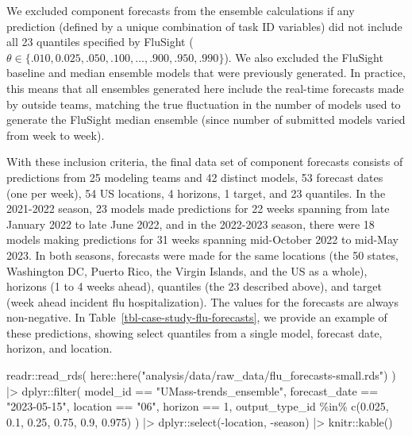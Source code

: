 \documentclass[
]{article}
\newenvironment{Shaded}{\begin{snugshade}}{\end{snugshade}}
\newcommand{\DecValTok}[1]{\textcolor[rgb]{0.68,0.00,0.00}{#1}}
\newcommand{\FloatTok}[1]{\textcolor[rgb]{0.68,0.00,0.00}{#1}}
\newcommand{\FunctionTok}[1]{\textcolor[rgb]{0.28,0.35,0.67}{#1}}
\newcommand{\NormalTok}[1]{\textcolor[rgb]{0.00,0.23,0.31}{#1}}
\newcommand{\SpecialCharTok}[1]{\textcolor[rgb]{0.37,0.37,0.37}{#1}}
\newcommand{\StringTok}[1]{\textcolor[rgb]{0.13,0.47,0.30}{#1}}
\begin{document}
We excluded component forecasts from the ensemble calculations if any
prediction (defined by a unique combination of task ID variables) did
not include all 23 quantiles specified by FluSight
(\(\theta \in \{.010, 0.025, .050, .100, ..., .900, .950, .990\}\)). We
also excluded the FluSight baseline and median ensemble models that were
previously generated. In practice, this means that all ensembles
generated here include the real-time forecasts made by outside teams,
matching the true fluctuation in the number of models used to generate
the FluSight median ensemble (since number of submitted models varied
from week to week).

With these inclusion criteria, the final data set of component forecasts
consists of predictions from 25 modeling teams and 42 distinct models,
53 forecast dates (one per week), 54 US locations, 4 horizons, 1 target,
and 23 quantiles. In the 2021-2022 season, 23 models made predictions
for 22 weeks spanning from late January 2022 to late June 2022, and in
the 2022-2023 season, there were 18 models making predictions for 31
weeks spanning mid-October 2022 to mid-May 2023. In both seasons,
forecasts were made for the same locations (the 50 states, Washington
DC, Puerto Rico, the Virgin Islands, and the US as a whole), horizons (1
to 4 weeks ahead), quantiles (the 23 described above), and target (week
ahead incident flu hospitalization). The values for the forecasts are
always non-negative. In Table~\ref{tbl-case-study-flu-forecasts}, we
provide an example of these predictions, showing select quantiles from a
single model, forecast date, horizon, and location.

\begin{Shaded}
\begin{Highlighting}[]
\NormalTok{readr}\SpecialCharTok{::}\FunctionTok{read\_rds}\NormalTok{(}
\NormalTok{  here}\SpecialCharTok{::}\FunctionTok{here}\NormalTok{(}\StringTok{"analysis/data/raw\_data/flu\_forecasts{-}small.rds"}\NormalTok{)}
\NormalTok{) }\SpecialCharTok{|\textgreater{}}
\NormalTok{  dplyr}\SpecialCharTok{::}\FunctionTok{filter}\NormalTok{(}
\NormalTok{    model\_id }\SpecialCharTok{==} \StringTok{"UMass{-}trends\_ensemble"}\NormalTok{,}
\NormalTok{    forecast\_date }\SpecialCharTok{==} \StringTok{"2023{-}05{-}15"}\NormalTok{,}
\NormalTok{    location }\SpecialCharTok{==} \StringTok{"06"}\NormalTok{,}
\NormalTok{    horizon }\SpecialCharTok{==} \DecValTok{1}\NormalTok{,}
\NormalTok{    output\_type\_id }\SpecialCharTok{\%in\%} \FunctionTok{c}\NormalTok{(}\FloatTok{0.025}\NormalTok{, }\FloatTok{0.1}\NormalTok{, }\FloatTok{0.25}\NormalTok{, }\FloatTok{0.75}\NormalTok{, }\FloatTok{0.9}\NormalTok{, }\FloatTok{0.975}\NormalTok{)}
\NormalTok{  ) }\SpecialCharTok{|\textgreater{}}
\NormalTok{  dplyr}\SpecialCharTok{::}\FunctionTok{select}\NormalTok{(}\SpecialCharTok{{-}}\NormalTok{location, }\SpecialCharTok{{-}}\NormalTok{season) }\SpecialCharTok{|\textgreater{}}
\NormalTok{  knitr}\SpecialCharTok{::}\FunctionTok{kable}\NormalTok{()}
\end{Highlighting}
\end{Shaded}
\end{document}
